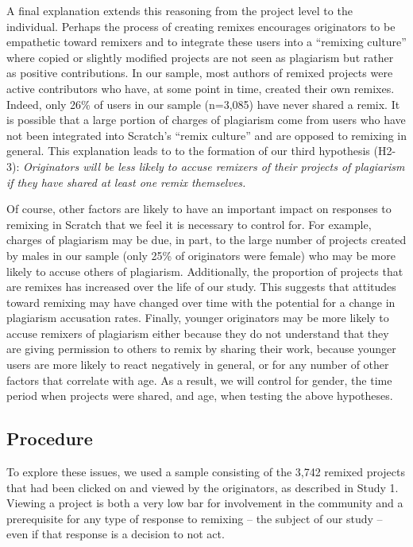 A final explanation extends this reasoning from the project level to the
individual. Perhaps the process of creating remixes encourages
originators to be empathetic toward remixers and to integrate these
users into a ``remixing culture'' where copied or slightly modified
projects are not seen as plagiarism but rather as positive
contributions. In our sample, most authors of remixed projects were
active contributors who have, at some point in time, created their own
remixes.  Indeed, only 26\% of users in our sample (n=3,085) have never
shared a remix. It is possible that a large portion of charges of
plagiarism come from users who have not been integrated into Scratch's
``remix culture'' and are opposed to remixing in general.  This
explanation leads to to the formation of our third hypothesis
(H2-3): {\em Originators will be less likely to accuse remixers of their
projects of plagiarism if they have shared at least one remix
themselves.}

Of course, other factors are likely to have an important impact on
responses to remixing in Scratch that we feel it is necessary to control
for.  For example, charges of plagiarism may be due, in part, to the
large number of projects created by males in our sample (only 25\% of
originators were female) who may be more likely to accuse others of
plagiarism.  Additionally, the proportion of projects that are remixes
has increased over the life of our study. This suggests that attitudes
toward remixing may have changed over time with the potential for a
change in plagiarism accusation rates.  Finally, younger originators may
be more likely to accuse remixers of plagiarism either because they do
not understand that they are giving permission to others to remix by
sharing their work, because younger users are more likely to react
negatively in general, or for any number of other factors that correlate
with age.  As a result, we will control for gender, the time period when
projects were shared, and age, when testing the above hypotheses.

\subsection{Procedure}

To explore these issues, we used a sample consisting of the 3,742
remixed projects that had been clicked on and viewed by the originators,
as described in Study 1.  Viewing a project is both a very low bar for
involvement in the community and a prerequisite for any type of response
to remixing -- the subject of our study -- even if that response is a
decision to not act. 

